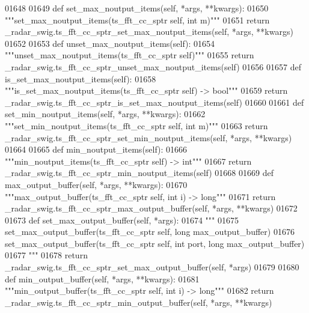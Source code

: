 \begin{DoxyCode}
{{{{{{{01648 
01649     \textcolor{keyword}{def }set_max_noutput_items(self, *args, **kwargs):
01650         \textcolor{stringliteral}{"""set\_max\_noutput\_items(ts\_fft\_cc\_sptr self, int m)"""}
01651         \textcolor{keywordflow}{return} \_radar\_swig.ts\_fft\_cc\_sptr\_set\_max\_noutput\_items(self, *args, **kwargs)
01652 
01653     \textcolor{keyword}{def }unset_max_noutput_items(self):
01654         \textcolor{stringliteral}{"""unset\_max\_noutput\_items(ts\_fft\_cc\_sptr self)"""}
01655         \textcolor{keywordflow}{return} \_radar\_swig.ts\_fft\_cc\_sptr\_unset\_max\_noutput\_items(self)
01656 
01657     \textcolor{keyword}{def }is_set_max_noutput_items(self):
01658         \textcolor{stringliteral}{"""is\_set\_max\_noutput\_items(ts\_fft\_cc\_sptr self) -> bool"""}
01659         \textcolor{keywordflow}{return} \_radar\_swig.ts\_fft\_cc\_sptr\_is\_set\_max\_noutput\_items(self)
01660 
01661     \textcolor{keyword}{def }set_min_noutput_items(self, *args, **kwargs):
01662         \textcolor{stringliteral}{"""set\_min\_noutput\_items(ts\_fft\_cc\_sptr self, int m)"""}
01663         \textcolor{keywordflow}{return} \_radar\_swig.ts\_fft\_cc\_sptr\_set\_min\_noutput\_items(self, *args, **kwargs)
01664 
01665     \textcolor{keyword}{def }min_noutput_items(self):
01666         \textcolor{stringliteral}{"""min\_noutput\_items(ts\_fft\_cc\_sptr self) -> int"""}
01667         \textcolor{keywordflow}{return} \_radar\_swig.ts\_fft\_cc\_sptr\_min\_noutput\_items(self)
01668 
01669     \textcolor{keyword}{def }max_output_buffer(self, *args, **kwargs):
01670         \textcolor{stringliteral}{"""max\_output\_buffer(ts\_fft\_cc\_sptr self, int i) -> long"""}
01671         \textcolor{keywordflow}{return} \_radar\_swig.ts\_fft\_cc\_sptr\_max\_output\_buffer(self, *args, **kwargs)
01672 
01673     \textcolor{keyword}{def }set_max_output_buffer(self, *args):
01674         \textcolor{stringliteral}{"""}
01675 \textcolor{stringliteral}{        set\_max\_output\_buffer(ts\_fft\_cc\_sptr self, long max\_output\_buffer)}
01676 \textcolor{stringliteral}{        set\_max\_output\_buffer(ts\_fft\_cc\_sptr self, int port, long max\_output\_buffer)}
01677 \textcolor{stringliteral}{        """}
01678         \textcolor{keywordflow}{return} \_radar\_swig.ts\_fft\_cc\_sptr\_set\_max\_output\_buffer(self, *args)
01679 
01680     \textcolor{keyword}{def }min_output_buffer(self, *args, **kwargs):
01681         \textcolor{stringliteral}{"""min\_output\_buffer(ts\_fft\_cc\_sptr self, int i) -> long"""}
01682         \textcolor{keywordflow}{return} \_radar\_swig.ts\_fft\_cc\_sptr\_min\_output\_buffer(self, *args, **kwargs)
}}}}}}}
\end{DoxyCode}
